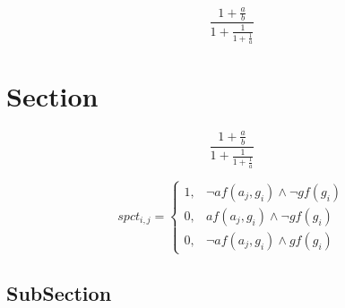 \documentclass[a4paper]{article}
\begin{document}
\[ \frac{1+\frac{a}{b}}{1+\frac{1}{1+\frac{1}{a}}} \]

\section{Section}

\[ \frac{1+\frac{a}{b}}{1+\frac{1}{1+\frac{1}{a}}} \]

\begin{equation}
spct_{i,j} =
\begin{cases}
1, & \text{$\neg af(a_j,g_i) \wedge \neg gf(g_i)$}\\
0, & \text{$af(a_j,g_i) \wedge \neg gf(g_i)$}\\
0, & \text{$\neg af(a_j,g_i) \wedge gf(g_i)$}
\end{cases}
\end{equation}

\subsection{SubSection}
\end{document}
